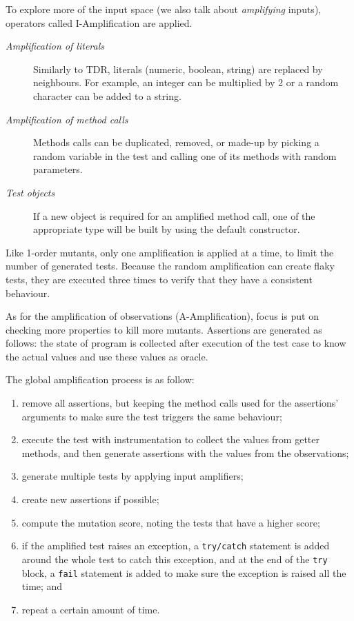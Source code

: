 \documentclass[a4paper,11pt]{sdm_internship}
\theoremstyle{definition}
\begin{document}
To explore more of the input space (we also talk about \emph{amplifying} inputs), operators called I-Amplification are applied.
\begin{description}
  \item[\textit{Amplification of literals}] Similarly to TDR, literals (numeric, boolean, string) are replaced by neighbours. For example, an integer can be multiplied by 2 or a random character can be added to a string.
  \item[\textit{Amplification of method calls}] Methods calls can be duplicated, removed, or made-up by picking a random variable in the test and calling one of its methods with random parameters.
  \item[\textit{Test objects}] If a new object is required for an amplified method call, one of the appropriate type will be built by using the default constructor.
\end{description}
Like 1-order mutants, only one amplification is applied at a time, to limit the number of generated tests.
Because the random amplification can create flaky tests, they are executed three times to verify that they have a consistent behaviour.

As for the amplification of observations (A-Amplification), focus is put on checking more properties to kill more mutants.
Assertions are generated as follows: the state of program is collected after execution of the test case to know the actual values and use these values as oracle.

The global amplification process is as follow:
\begin{enumerate}
  \item remove all assertions, but keeping the method calls used for the assertions' arguments to make sure the test triggers the same behaviour;
  \item execute the test with instrumentation to collect the values from getter methods, and then generate assertions with the values from the observations;
  \item generate multiple tests by applying input amplifiers;
  \item create new assertions if possible;
  \item compute the mutation score, noting the tests that have a higher score;
  \item if the amplified test raises an exception, a \texttt{try/catch} statement is added around the whole test to catch this exception, and at the end of the \texttt{try} block, a \texttt{fail} statement is added to make sure the exception is raised all the time; and
  \item repeat a certain amount of time.
\end{enumerate}
\end{document}
